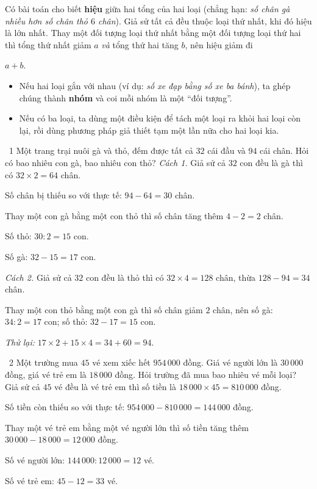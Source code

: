 \begin{knowbox}
Có bài toán cho biết \textbf{hiệu} giữa hai tổng của hai loại (chẳng hạn: \emph{số chân gà nhiều hơn số chân thỏ $6$ chân}). Giả sử tất cả đều thuộc loại thứ nhất, khi đó hiệu là lớn nhất. Thay một đối tượng loại thứ nhất bằng một đối tượng loại thứ hai thì tổng thứ nhất giảm $a$ \emph{và} tổng thứ hai tăng $b$, nên hiệu giảm đi
\begin{center}
$a+b$.
\end{center}
\end{knowbox}

\begin{knowbox}
\begin{itemize}[leftmargin=1.4em,itemsep=3pt]
\item Nếu hai loại gắn với nhau (ví dụ: \emph{số xe đạp bằng số xe ba bánh}), ta ghép chúng thành \textbf{nhóm} và coi mỗi nhóm là một ``đối tượng''.
\item Nếu có ba loại, ta dùng một điều kiện để tách một loại ra khỏi hai loại còn lại, rồi dùng phương pháp giả thiết tạm một lần nữa cho hai loại kia.
\end{itemize}
\end{knowbox}
\gap
\begin{exbox}{\ExWord\ 1}
Một trang trại nuôi gà và thỏ, đếm được tất cả $32$ cái đầu và $94$ cái chân. Hỏi có bao nhiêu con gà, bao nhiêu con thỏ?
\guide
\emph{Cách 1.} Giả sử cả $32$ con đều là gà thì có $32\times2=64$ chân.\par
Số chân bị thiếu so với thực tế: $94-64=30$ chân.\par
Thay một con gà bằng một con thỏ thì số chân tăng thêm $4-2=2$ chân.\par
Số thỏ: $30:2=15$ con.\par Số gà: $32-15=17$ con.\par
\emph{Cách 2.} Giả sử cả $32$ con đều là thỏ thì có $32\times4=128$ chân, thừa $128-94=34$ chân.\par
Thay một con thỏ bằng một con gà thì số chân giảm $2$ chân, nên số gà: $34:2=17$ con; số thỏ: $32-17=15$ con.\par
\emph{Thử lại:} $17\times2+15\times4=34+60=94$.
\end{exbox}
\gap
\begin{exbox}{\ExWord\ 2}
Một trường mua $45$ vé xem xiếc hết $954\,000$ đồng. Giá vé người lớn là $30\,000$ đồng, giá vé trẻ em là $18\,000$ đồng. Hỏi trường đã mua bao nhiêu vé mỗi loại?
\guide
Giả sử cả $45$ vé đều là vé trẻ em thì số tiền là $18\,000\times45=810\,000$ đồng.\par
Số tiền còn thiếu so với thực tế: $954\,000-810\,000=144\,000$ đồng.\par
Thay một vé trẻ em bằng một vé người lớn thì số tiền tăng thêm $30\,000-18\,000=12\,000$ đồng.\par
Số vé người lớn: $144\,000:12\,000=12$ vé.\par Số vé trẻ em: $45-12=33$ vé.
\end{exbox}
